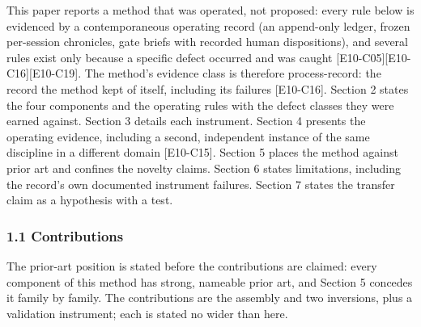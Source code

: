 \documentclass[
  11pt,
]{article}
\begin{document}
This paper reports a method that was operated, not proposed: every rule
below is evidenced by a contemporaneous operating record (an append-only
ledger, frozen per-session chronicles, gate briefs with recorded human
dispositions), and several rules exist only because a specific defect
occurred and was caught {[}E10-C05{]}{[}E10-C16{]}{[}E10-C19{]}. The
method's evidence class is therefore process-record: the record the
method kept of itself, including its failures {[}E10-C16{]}. Section 2
states the four components and the operating rules with the defect
classes they were earned against. Section 3 details each instrument.
Section 4 presents the operating evidence, including a second,
independent instance of the same discipline in a different domain
{[}E10-C15{]}. Section 5 places the method against prior art and
confines the novelty claims. Section 6 states limitations, including the
record's own documented instrument failures. Section 7 states the
transfer claim as a hypothesis with a test.

\subsubsection{1.1 Contributions}\label{contributions}

The prior-art position is stated before the contributions are claimed:
every component of this method has strong, nameable prior art, and
Section 5 concedes it family by family. The contributions are the
assembly and two inversions, plus a validation instrument; each is
stated no wider than here.
\end{document}
